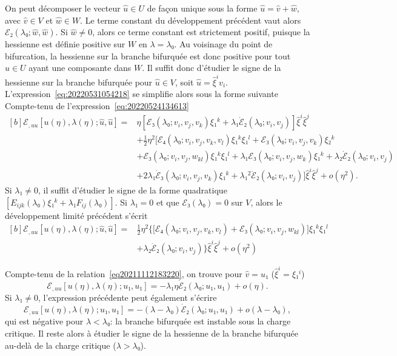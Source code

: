 \documentclass[12pt, final]{amsart}
\theoremstyle{definition}
\begin{document}
On peut décomposer le vecteur \(\hat{u}∈U\) de façon unique sous la forme
\(\hat{u} = \hat{v} + \hat{w}\), avec \(\hat{v}∈V\) et \(\hat{w}∈W\). Le terme
constant du développement précédent vaut alors \(ℰ₂(λ₀; \hat{w}, \hat{w})\). Si
\(\hat{w} ≠ 0\), alors ce terme constant est strictement positif, puisque la
hessienne est définie positive sur \(W\) en \(λ = λ₀\). Au voisinage du point de
bifurcation, la hessienne sur la branche bifurquée est donc positive pour tout
\(\hat{u}∈U\) ayant une composante dans \(W\). Il suffit donc d'étudier le signe
de la hessienne sur la branche bifurquée pour \(\hat{u}∈V\), soit
\(\hat{u} = \hat{ξ}^i v_i\). L'expression~\eqref{eq:20220531054218} se simplifie
alors sous la forme suivante Compte-tenu de
l'expression~\eqref{eq:20220524134613}
\begin{equation}
  \begin{aligned}[b]
    ℰ_{, uu}[u(η), λ(η); \hat{u}, \hat{u}] ={}
    & η [ℰ₃(λ₀; v_i, v_j, v_k) ξ₁^k + λ₁ \dot{ℰ}₂(λ₀; v_i, v_j)] \hat{ξ}^i \hat{ξ}^j\\
    & + \tfrac{1}{2} η^2 \bigl[ℰ₄(λ₀; v_i, v_j, v_k, v_l) ξ₁^k ξ₁^l + ℰ₃(λ₀; v_i, v_j, v_k) ξ₂^k\\
    & + ℰ₃(λ₀; v_i, v_j, w_{k l}) ξ₁^k ξ₁^l + λ₁ ℰ₃(λ₀; v_i, v_j, w_k) ξ₁^k + λ₂ \dot{ℰ}₂(λ₀; v_i, v_j)\\
    & + 2 λ₁ \dot{ℰ}₃(λ₀; v_i, v_j, v_k) ξ₁^k + λ₁^2 \ddot{ℰ}₂(λ₀; v_i, v_j)\bigr] \hat{ξ}^i \hat{ξ}^j + o(η^2).
  \end{aligned}
\end{equation}
Si \(λ₁ ≠ 0\), il suffit d'étudier le signe de la forme quadratique
\([E_{i j k}(λ₀) ξ₁^k + λ₁ F_{i j}(λ₀)].\) Si \(λ₁ = 0\) et que \(ℰ₃(λ₀) = 0\)
sur \(V\), alors le développement limité précédent s'écrit
\begin{equation}
  \begin{aligned}[b]
    ℰ_{, uu} [u(η), λ(η); \hat{u}, \hat{u}] ={}
    & \tfrac{1}{2} η^2 \bigl\{ \bigl[ℰ₄(λ₀; v_i, v_j, v_k, v_l) + ℰ₃(λ₀; v_i, v_j, w_{k l})\bigr] ξ₁^k ξ₁^l\\
    & + λ₂ \dot{ℰ}₂(λ₀; v_i, v_j) \bigr\} \hat{ξ}^i \hat{ξ}^j + o(η^2)
  \end{aligned}
\end{equation}

Compte-tenu de la relation~\eqref{eq20211112183220}, on trouve pour \(\hat{v} = u₁\) (\(\hat{ξ}^i = ξ₁^i\))
\begin{equation}
 ℰ_{, uu} [u(η), λ(η); u₁, u₁] = -λ₁ η \dot{ℰ}₂(λ₀; u₁, u₁) + o(η).
\end{equation}
Si \(λ₁ \neq 0\), l'expression précédente peut également s'écrire
\begin{equation}
 ℰ_{, uu} [u(η), λ(η); u₁, u₁] = -(λ - λ₀) \dot{ℰ}₂(λ₀; u₁, u₁) + o(λ - λ₀),
\end{equation}
qui est négative pour \(λ < λ₀\): la branche bifurquée est instable sous la
charge critique. Il reste alors à étudier le signe de la hessienne de la branche
bifurquée au-delà de la charge critique (\(λ > λ₀\)).
\end{document}

